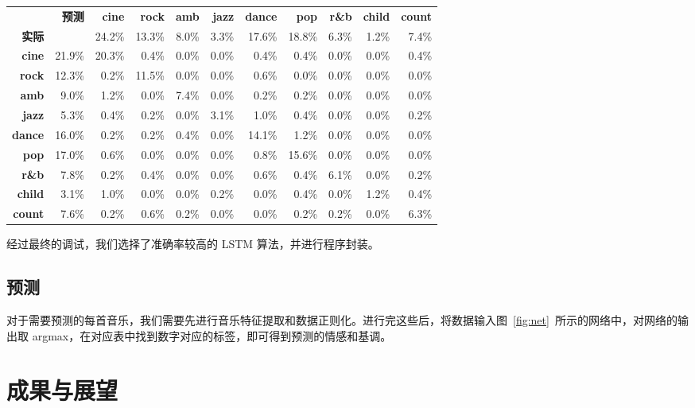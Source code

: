 \documentclass[a4paper,utf8,10pt]{article}
\begin{document}
\begin{center}
 \label{tab:genrecm}
\begin{tabular}{ | r r | r | r | r | r | r | r | r | r | r | }
\hline
 & \bf 预测 & \bf cine & \bf rock & \bf amb & \bf jazz & \bf dance & \bf pop & \bf r\&b & \bf child & \bf count \\
\bf 实际 & & 24.2\% & 13.3\% & 8.0\% & 3.3\% & 17.6\% & 18.8\% & 6.3\% & 1.2\% & 7.4\% \\\hline
\bf cine & 21.9\% & 20.3\% & 0.4\% & 0.0\% & 0.0\% & 0.4\% & 0.4\% & 0.0\% & 0.0\% & 0.4\% \\\hline
\bf rock & 12.3\% & 0.2\% & 11.5\% & 0.0\% & 0.0\% & 0.6\% & 0.0\% & 0.0\% & 0.0\% & 0.0\% \\\hline
\bf amb & 9.0\% & 1.2\% & 0.0\% & 7.4\% & 0.0\% & 0.2\% & 0.2\% & 0.0\% & 0.0\% & 0.0\% \\\hline
\bf jazz & 5.3\% & 0.4\% & 0.2\% & 0.0\% & 3.1\% & 1.0\% & 0.4\% & 0.0\% & 0.0\% & 0.2\% \\\hline
\bf dance & 16.0\% & 0.2\% & 0.2\% & 0.4\% & 0.0\% & 14.1\% & 1.2\% & 0.0\% & 0.0\% & 0.0\% \\\hline
\bf pop & 17.0\% & 0.6\% & 0.0\% & 0.0\% & 0.0\% & 0.8\% & 15.6\% & 0.0\% & 0.0\% & 0.0\% \\\hline
\bf r\&b & 7.8\% & 0.2\% & 0.4\% & 0.0\% & 0.0\% & 0.6\% & 0.4\% & 6.1\% & 0.0\% & 0.2\% \\\hline
\bf child & 3.1\% & 1.0\% & 0.0\% & 0.0\% & 0.2\% & 0.0\% & 0.4\% & 0.0\% & 1.2\% & 0.4\% \\\hline
\bf count & 7.6\% & 0.2\% & 0.6\% & 0.2\% & 0.0\% & 0.0\% & 0.2\% & 0.2\% & 0.0\% & 6.3\% \\\hline
\end{tabular}

\end{center}

经过最终的调试，我们选择了准确率较高的 LSTM 算法，并进行程序封装。

\subsection{预测}\label{sec:predict}

对于需要预测的每首音乐，我们需要先进行音乐特征提取和数据正则化。进行完这些后，将数据输入图~\ref{fig:net}~所示的网络中，对网络的输出取 argmax，在对应表中找到数字对应的标签，即可得到预测的情感和基调。

\section{成果与展望}
\end{document}
